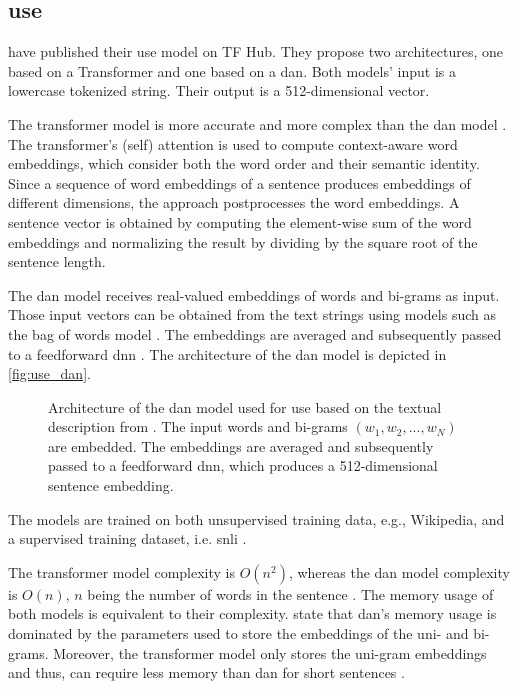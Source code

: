 \subsection{\ac{use}}\label{subsec:univ-sent-encoder}

\citeauthor{UniversalSentEnc2018} have published their \ac{use} model on TF Hub.
They propose two architectures, one based on a Transformer and one based on a \ac{dan}.
Both models' input is a lowercase tokenized string.
Their output is a 512-dimensional vector.

The transformer model is more accurate and more complex than the \ac{dan} model \cite{UniversalSentEnc2018}.
The transformer's (self) attention is used to compute context-aware word embeddings, which consider both the word order and their semantic identity.
Since a sequence of word embeddings of a sentence produces embeddings of different dimensions, the approach postprocesses the word embeddings.
A sentence vector is obtained by computing the element-wise sum of the word embeddings 
and normalizing the result by dividing by the square root of the sentence length.

The \ac{dan} model receives real-valued embeddings of words and bi-grams as input.
Those input vectors can be obtained from the text strings using models such as the bag of words model \cite{UniversalSentEnc-dan-input-emb}.
The embeddings are averaged and subsequently passed to a feedforward \ac{dnn} \cite{UniversalSentEnc2018}.
The architecture of the \ac{dan} model is depicted in \autoref{fig:use_dan}.

\begin{figure}[htp] %
    \centering
    
    \caption[Architecture of \ac{use}]{Architecture of the \ac{dan} model used for \ac{use} based on the textual description from \cite{inferSent2018}.
    The input words and bi-grams $(w_1, w_2, ..., w_N)$ are embedded.
    The embeddings are averaged and subsequently passed to a feedforward \ac{dnn}, which produces a 512-dimensional sentence embedding.
    }
    \label{fig:use_dan}
\end{figure}

The models are trained on both unsupervised training data, e.g., Wikipedia, and a supervised training dataset, i.e. \ac{snli} \cite{UniversalSentEnc2018, HfsentTrans2019}.

The transformer model complexity is $O(n^2)$, whereas the \ac{dan} model complexity is $O(n)$, 
$n$ being the number of words in the sentence \cite{UniversalSentEnc2018}.
The memory usage of both models is equivalent to their complexity.
\citeauthor{UniversalSentEnc2018} state that \ac{dan}'s memory usage is dominated by the parameters used to store the embeddings of the uni- and bi-grams.
Moreover, the transformer model only stores the uni-gram embeddings and thus, can require less memory than \ac{dan} for short sentences \cite{UniversalSentEnc2018}.